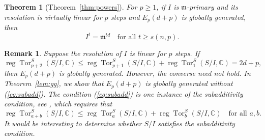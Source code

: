 \documentclass[11pt,letterpaper,reqno]{amsart}
\newcommand{\CC}{\mathbb{C}}
\newcommand{\m}{\mathfrak{m}}
\newcommand{\Tor}{\operatorname{Tor}}
\newcommand{\reg}{\operatorname{reg}}
\newtheorem{remark}[theorem]{Remark}
\newtheorem{thmx}{Theorem}
\theoremstyle{definition}
\numberwithin{equation}{section}
\begin{document}
\begin{thmx}[Theorem~\ref{thm:powers}]
    For $p \ge 1$, if $I$ is $\m$-primary and its resolution is virtually linear for $p$ steps and $E_p(d+p)$ is globally generated, then
    \[I^t = \m^{td} \quad \text{for all }t \ge s(n,p).\]
\end{thmx}
\begin{remark}
    Suppose the resolution of $I$ is linear for $p$ steps. If
    \begin{equation}\label{eq:subadd}
        \reg \Tor_{p+2}^S(S/I,\CC) \le \reg \Tor_{p+1}^S(S/I,\CC) + \reg \Tor_{1}^S(S/I,\CC) = 2d+p,
    \end{equation}
    then $E_p(d+p)$ is globally generated. However, the converse need not hold. In Theorem~\ref{lem:gg}, we show that $E_p(d+p)$ is globally generated without (\ref{eq:subadd}). The condition (\ref{eq:subadd}) is one instance of the subadditivity condition, see \cite{M-Subadd}, which requires that
    \[\reg \Tor_{a+b}^S(S/I,\CC) \le \reg \Tor_{a}^S(S/I,\CC) + \reg \Tor_{b}^S(S/I,\CC) \quad \text{for all }a,b.\]
    It would be interesting to determine whether $S/I$ satisfies the subadditivity condition.
\end{remark}
\end{document}
